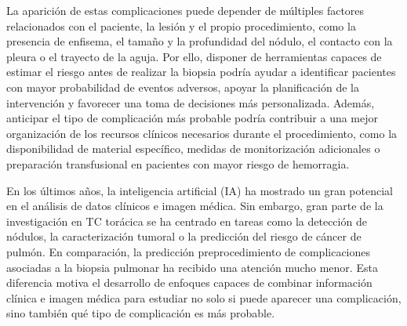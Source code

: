 La aparición de estas complicaciones puede depender de múltiples factores relacionados con el paciente, la lesión y el propio procedimiento, como la presencia de enfisema, el tamaño y la profundidad del nódulo, el contacto con la pleura o el trayecto de la aguja. Por ello, disponer de herramientas capaces de estimar el riesgo antes de realizar la biopsia podría ayudar a identificar pacientes con mayor probabilidad de eventos adversos, apoyar la planificación de la intervención y favorecer una toma de decisiones más personalizada. Además, anticipar el tipo de complicación más probable podría contribuir a una mejor organización de los recursos clínicos necesarios durante el procedimiento, como la disponibilidad de material específico, medidas de monitorización adicionales o preparación transfusional en pacientes con mayor riesgo de hemorragia.

En los últimos años, la inteligencia artificial (IA) ha mostrado un gran potencial en el análisis de datos clínicos e imagen médica. Sin embargo, gran parte de la investigación en TC torácica se ha centrado en tareas como la detección de nódulos, la caracterización tumoral o la predicción del riesgo de cáncer de pulmón. En comparación, la predicción preprocedimiento de complicaciones asociadas a la biopsia pulmonar ha recibido una atención mucho menor. Esta diferencia motiva el desarrollo de enfoques capaces de combinar información clínica e imagen médica para estudiar no solo si puede aparecer una complicación, sino también qué tipo de complicación es más probable.




